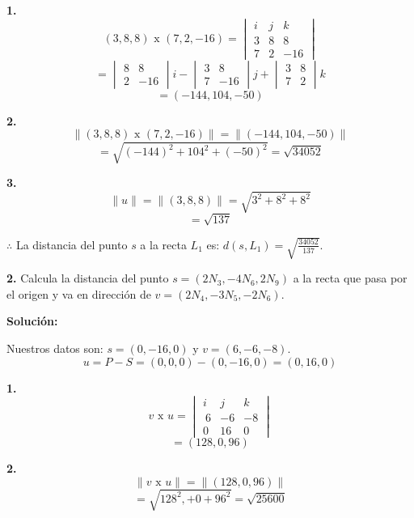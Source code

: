 \documentclass{article}
\begin{document}
\begin{minipage}[c]{0.5cm}
    \textbf{1.}
    $$(3,8,8) \text{ x }(7,2,-16) = \begin{vmatrix}
        i & j & k\\
        3 & 8 & 8 \\
        7 & 2 & -16
    \end{vmatrix}$$
    $$= \begin{vmatrix}
        8 & 8 \\
        2 & -16
    \end{vmatrix}i - \begin{vmatrix}
        3 & 8 \\
        7 & -16
    \end{vmatrix}j+ \begin{vmatrix}
        3 & 8 \\
        7 & 2
    \end{vmatrix}k$$
    $$=(-144, 104, -50)$$
\end{minipage}\hspace*{7cm}\begin{minipage}[c]{0.5cm}
    \textbf{2.}
    $$\|(3,8,8) \text{ x }(7,2,-16)\|= \|(-144,104,-50)\|$$
    $$=\sqrt{(-144)^2+104^2+(-50)^2} = \sqrt{34052}$$
\end{minipage}
\vspace{10pt}

\begin{minipage}[c]{0.5cm}
    \textbf{3.}
    $$\|u\| =\|(3,8, 8)\| = \sqrt{3^2+8^2+8^2}$$
    $$= \sqrt{137}$$
\end{minipage}

$\therefore$ La distancia del punto $s$ a la recta $L_1$ es: $d(s,L_1)= \sqrt{\frac{34052}{137}}$.
\vspace{10pt}

\textbf{2.} Calcula la distancia del punto $s = (2N_3, -4N_6, 2N_9)$ a la recta que pasa por el origen y va en dirección de 
$v = (2N_4, -3N_5, -2N_6)$.
\vspace{10pt}

\textbf{Solución:}
\vspace{10pt}

Nuestros datos son: $s = (0, -16, 0)$ y $v = (6, -6, -8)$.
 $$u = P-S =(0,0,0)- (0,-16,0) = (0,16,0)$$

\begin{minipage}[c]{0.5cm}
    \textbf{1.}
    $$v \text{ x } u = \begin{vmatrix}
        i & j & k\\\
        6 & -6 & -8 \\
        0 & 16 & 0
    \end{vmatrix}$$
    $$=(128, 0, 96)$$
\end{minipage}\hspace*{7cm}\begin{minipage}[c]{0.5cm}
    \textbf{2.}
    $$\|v \text{ x } u\| = \|(128, 0, 96)\|$$
    $$= \sqrt{128^2, +0 + 96^2} = \sqrt{25600}$$
\end{minipage}
\vspace{10pt}
\end{document}
